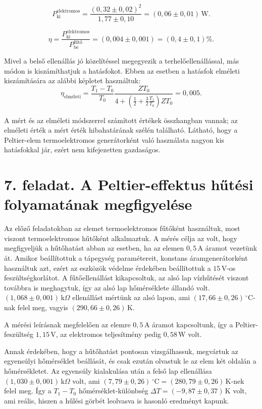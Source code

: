 \documentclass[11pt]{article}
\begin{document}
$$
P_{\text{ki}}^{\text{elektromos}} = \frac{(0,32 \pm 0,02)^2}{1,77 \pm 0,10} = (0,06 \pm 0,01) \,\mathrm{W}.
$$

$$
\eta = \frac{P_{\text{ki}}^{\text{elektromos}}}{P_{\text{be}}^{\text{fűtő}}} = (0,004 \pm 0,001) = (0,4 \pm 0,1)\%.
$$

Mivel a belső ellenállás jó közelítéssel megegyezik a terhelőellenállással, más módon is kiszámíthatjuk a hatásfokot. Ebben az esetben a hatásfok elméleti kiszámítására az alábbi képletet használtuk:
$$
\eta_{\text{elméleti}} = \frac{T_1 - T_0}{T_0} \frac{ZT_0}{4 + \left(\frac{1}{2} + \frac{3}{2} \frac{T_1}{T_0}\right) ZT_0} = 0,005.
$$

A mért és az elméleti módszerrel számított értékek összhangban vannak; az elméleti érték a mért érték hibahatárának szélén található. Látható, hogy a Peltier-elem termoelektromos generátorként való használata nagyon kis hatásfokkal jár, ezért nem kifejezetten gazdaságos.

\section*{7. feladat. A Peltier-effektus hűtési folyamatának megfigyelése}

Az előző feladatokban az elemet termoelektromos fűtőként használtuk, most viszont termoelektromos hűtőként alkalmaztuk. A mérés célja az volt, hogy megfigyeljük a hűtőhatást abban az esetben, ha az elemen $0,5 \,\mathrm{A}$ áramot vezetünk át. Amikor beállítottuk a tápegység paramétereit, konstans áramgenerátorként használtuk azt, ezért az eszközök védelme érdekében beállítottuk a $15 \,\mathrm{V}$-os feszültségkorlátot. A fűtőellenállást kikapcsoltuk, az alsó lap vízhűtését viszont továbbra is meghagytuk, így az alsó lap hőmérséklete állandó volt. $(1,068 \pm 0,001) \,\mathrm{k}\Omega$ ellenállást mértünk az alsó lapon, ami $(17,66 \pm 0,26) \,^\circ\mathrm{C}$-nak felel meg, vagyis $(290,66 \pm 0,26) \,\mathrm{K}$.

A mérési leírásnak megfelelően az elemre $0,5 \,\mathrm{A}$ áramot kapcsoltunk, így a Peltier-feszültség $1,15 \,\mathrm{V}$, az elektromos teljesítmény pedig $0,58 \,\mathrm{W}$ volt.

Annak érdekében, hogy a hűtőhatást pontosan vizsgálhassuk, megvártuk az egyensúlyi hőmérséklet beállását, és csak ezután olvastuk le az elem két oldalán a hőmérsékletet. Az egyensúly kialakulása után a felső lap ellenállása $(1,030 \pm 0,001) \,\mathrm{k}\Omega$ volt, ami $(7,79 \pm 0,26) \,^\circ\mathrm{C} = (280,79 \pm 0,26) \,\mathrm{K}$-nek felel meg. Így a $T_{1}-T_{0}$ hőmérséklet-különbség $\Delta T = (-9,87 \pm 0,37) \,\mathrm{K}$ volt, ami reális, hiszen a hűlési görbét leolvasva is hasonló eredményt kapunk.
\end{document}
